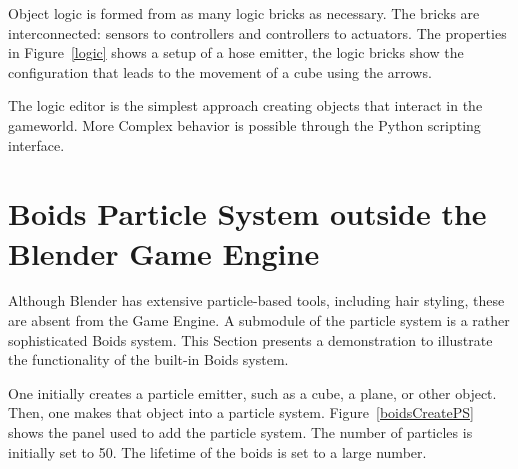 Object logic is formed from as many logic bricks as necessary. The bricks are interconnected: sensors to controllers and controllers to actuators. The properties in Figure~\ref{logic} shows a setup of a hose emitter, the logic bricks show the configuration that leads to the movement of a cube using the arrows.

The logic editor is the simplest approach creating objects that interact in the gameworld. More Complex behavior is possible through the Python scripting interface.

\section{Boids Particle System outside the Blender Game Engine}
Although Blender has extensive particle-based tools, including hair styling, these are absent from the Game Engine. A submodule of the particle system is a rather sophisticated Boids system. This Section presents a demonstration to illustrate the functionality of the built-in Boids system. 

One initially creates a particle emitter, such as a cube, a plane, or other object. Then, one makes that object into a particle system. Figure~\ref{boidsCreatePS} shows the panel used to add the particle system. The number of particles is initially set to 50. The lifetime of the boids is set to a large number.

